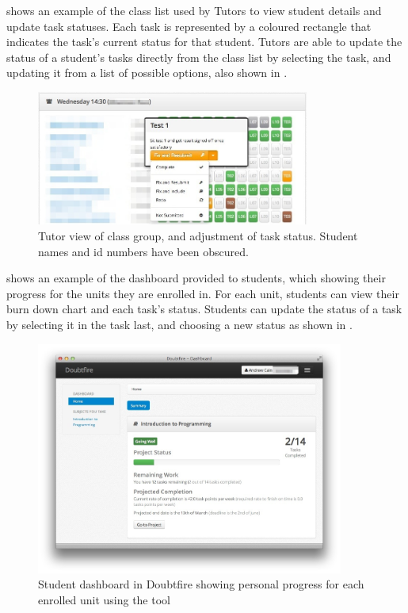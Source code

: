 shows an example of the class list used by Tutors to view student details and update task statuses. Each task is represented by a coloured rectangle that indicates the task's current status for that student. Tutors are able to update the status of a student's tasks directly from the class list by selecting the task, and updating it from a list of possible options, also shown in .

\begin{figure}[thbp]
  \centering
  \includegraphics[width=0.8\textwidth]{TutorView}
  \caption{Tutor view of class group, and adjustment of task status. Student names and id numbers have been obscured.}
  \label{fig:tutor_view}
\end{figure}

 shows an example of the dashboard provided to students, which showing their progress for the units they are enrolled in. For each unit, students can view their burn down chart and each task's status. Students can update the status of a task by selecting it in the task last, and choosing a new status as shown in .

\begin{figure}[thbp]
  \centering
  \includegraphics[width=0.9\textwidth]{HomePage}%
  \caption{Student dashboard in Doubtfire showing personal progress for each enrolled unit using the tool}%
  \label{fig:home_page}
\end{figure}

